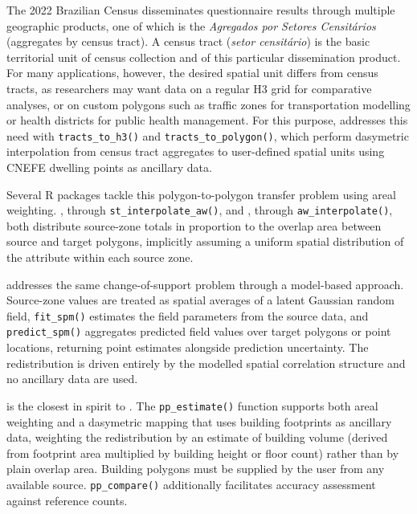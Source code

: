 The 2022 Brazilian Census disseminates questionnaire results through
multiple geographic products, one of which is the \emph{Agregados por Setores
Censitários} (aggregates by census tract). A census tract (\emph{setor
censitário}) is the basic territorial unit of census collection and of
this particular dissemination product. For many applications, however,
the desired spatial unit differs from census tracts, as researchers may
want data on a regular H3 grid for comparative analyses, or on custom
polygons such as traffic zones for transportation modelling or health
districts for public health management. For this purpose,
 addresses this need with \texttt{tracts\_to\_h3()} and \texttt{tracts\_to\_polygon()},
which perform dasymetric interpolation \citep{mennis2003} from census tract aggregates
to user-defined spatial units using CNEFE dwelling points as ancillary data.

Several R packages tackle this polygon-to-polygon transfer problem using
areal weighting.  \citep{pebesma2018}, through
\texttt{st\_interpolate\_aw()}, and  \citep{prener2019}, through
\texttt{aw\_interpolate()}, both distribute source-zone totals in proportion to
the overlap area between source and target polygons, implicitly assuming
a uniform spatial distribution of the attribute within each source zone.

 \citep{smile2025} addresses the same change-of-support problem through a
model-based approach. Source-zone values are treated as spatial averages
of a latent Gaussian random field, \texttt{fit\_spm()} estimates the field
parameters from the source data, and \texttt{predict\_spm()} aggregates
predicted field values over target polygons or point locations, returning
point estimates alongside prediction uncertainty. The redistribution is driven
entirely by the modelled spatial correlation structure and no ancillary data are
used.

 \citep{batsaris2023} is the closest in spirit to
. The \texttt{pp\_estimate()} function supports both areal
weighting and a dasymetric mapping that uses building footprints as
ancillary data, weighting the redistribution by an estimate of building
volume (derived from footprint area multiplied by building height or
floor count) rather than by plain overlap area. Building
polygons must be supplied by the user from any available source.
\texttt{pp\_compare()} additionally facilitates accuracy assessment against
reference counts.

